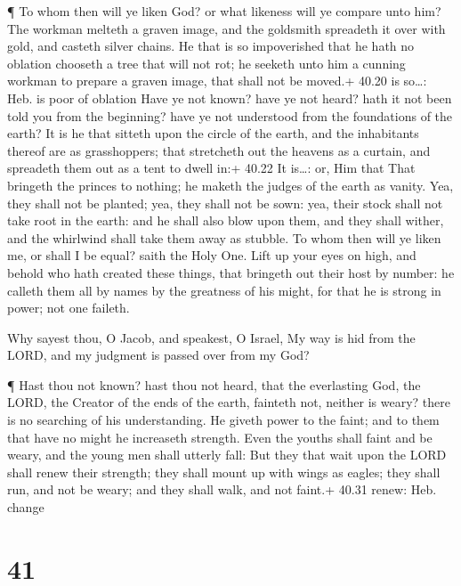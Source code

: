  ¶ To whom then will ye liken God? or what likeness will ye
compare unto him?  The workman melteth a graven image, and
the goldsmith spreadeth it over with gold, and casteth silver chains.
 He that is so impoverished that he hath no oblation
chooseth a tree that will not rot; he seeketh unto him a cunning workman
to prepare a graven image, that shall not be moved.+ 40.20 is so\ldots:
Heb. is poor of oblation  Have ye not known? have ye not
heard? hath it not been told you from the beginning? have ye not
understood from the foundations of the earth?  It is he
that sitteth upon the circle of the earth, and the inhabitants thereof
are as grasshoppers; that stretcheth out the heavens as a curtain, and
spreadeth them out as a tent to dwell in:+ 40.22 It is\ldots: or, Him
that  That bringeth the princes to nothing; he maketh the
judges of the earth as vanity.  Yea, they shall not be
planted; yea, they shall not be sown: yea, their stock shall not take
root in the earth: and he shall also blow upon them, and they shall
wither, and the whirlwind shall take them away as stubble. 
To whom then will ye liken me, or shall I be equal? saith the Holy One.
 Lift up your eyes on high, and behold who hath created
these things, that bringeth out their host by number: he calleth them
all by names by the greatness of his might, for that he is strong in
power; not one faileth.

 Why sayest thou, O Jacob, and speakest, O Israel, My way
is hid from the LORD, and my judgment is passed over from my God?

 ¶ Hast thou not known? hast thou not heard, that the
everlasting God, the LORD, the Creator of the ends of the earth,
fainteth not, neither is weary? there is no searching of his
understanding.  He giveth power to the faint; and to them
that have no might he increaseth strength.  Even the youths
shall faint and be weary, and the young men shall utterly fall:
 But they that wait upon the LORD shall renew their
strength; they shall mount up with wings as eagles; they shall run, and
not be weary; and they shall walk, and not faint.+ 40.31 renew: Heb.
change

\hypertarget{section-40}{%
\section{41}\label{section-40}}

